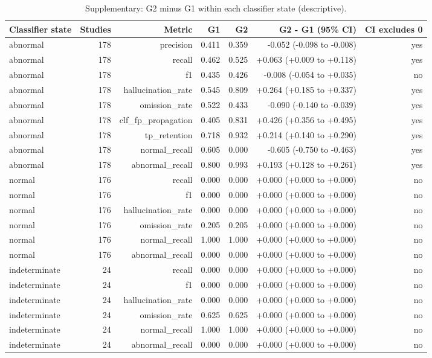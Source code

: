 \begin{table}[t]
\centering
\scriptsize
\begin{tabular}{lrrrrrr}
\hline
Classifier state & Studies & Metric & G1 & G2 & G2 - G1 (95\% CI) & CI excludes 0 \\
\hline
abnormal & 178 & precision & 0.411 & 0.359 & -0.052 (-0.098 to -0.008) & yes \\
abnormal & 178 & recall & 0.462 & 0.525 & +0.063 (+0.009 to +0.118) & yes \\
abnormal & 178 & f1 & 0.435 & 0.426 & -0.008 (-0.054 to +0.035) & no \\
abnormal & 178 & hallucination\_rate & 0.545 & 0.809 & +0.264 (+0.185 to +0.337) & yes \\
abnormal & 178 & omission\_rate & 0.522 & 0.433 & -0.090 (-0.140 to -0.039) & yes \\
abnormal & 178 & clf\_fp\_propagation & 0.405 & 0.831 & +0.426 (+0.356 to +0.495) & yes \\
abnormal & 178 & tp\_retention & 0.718 & 0.932 & +0.214 (+0.140 to +0.290) & yes \\
abnormal & 178 & normal\_recall & 0.605 & 0.000 & -0.605 (-0.750 to -0.463) & yes \\
abnormal & 178 & abnormal\_recall & 0.800 & 0.993 & +0.193 (+0.128 to +0.261) & yes \\
normal & 176 & recall & 0.000 & 0.000 & +0.000 (+0.000 to +0.000) & no \\
normal & 176 & f1 & 0.000 & 0.000 & +0.000 (+0.000 to +0.000) & no \\
normal & 176 & hallucination\_rate & 0.000 & 0.000 & +0.000 (+0.000 to +0.000) & no \\
normal & 176 & omission\_rate & 0.205 & 0.205 & +0.000 (+0.000 to +0.000) & no \\
normal & 176 & normal\_recall & 1.000 & 1.000 & +0.000 (+0.000 to +0.000) & no \\
normal & 176 & abnormal\_recall & 0.000 & 0.000 & +0.000 (+0.000 to +0.000) & no \\
indeterminate & 24 & recall & 0.000 & 0.000 & +0.000 (+0.000 to +0.000) & no \\
indeterminate & 24 & f1 & 0.000 & 0.000 & +0.000 (+0.000 to +0.000) & no \\
indeterminate & 24 & hallucination\_rate & 0.000 & 0.000 & +0.000 (+0.000 to +0.000) & no \\
indeterminate & 24 & omission\_rate & 0.625 & 0.625 & +0.000 (+0.000 to +0.000) & no \\
indeterminate & 24 & normal\_recall & 1.000 & 1.000 & +0.000 (+0.000 to +0.000) & no \\
indeterminate & 24 & abnormal\_recall & 0.000 & 0.000 & +0.000 (+0.000 to +0.000) & no \\
\hline
\end{tabular}
\caption{Supplementary: G2 minus G1 within each classifier state (descriptive).}
\label{tab:table9_supplementary_stratified_by_classifier_state}
\end{table}

